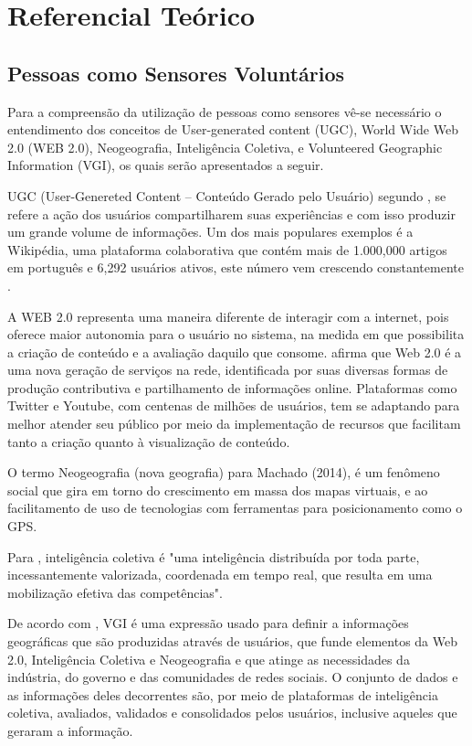 
\chapter{Referencial Teórico}

\section{Pessoas como Sensores Voluntários}
Para a compreensão da utilização de pessoas como sensores vê-se necessário o entendimento dos conceitos de User-generated content (UGC), World Wide Web 2.0 (WEB 2.0), Neogeografia, Inteligência Coletiva, e Volunteered Geographic Information (VGI), os quais serão apresentados a seguir. 

UGC (User-Genereted Content – Conteúdo Gerado pelo Usuário) segundo \cite{santos_avaliacao_2016}, se refere a ação dos usuários compartilharem suas experiências e com isso produzir um grande volume de informações. Um dos mais populares exemplos é a Wikipédia, uma plataforma colaborativa que contém mais de 1.000,000 artigos em português e 6,292 usuários ativos, este número vem crescendo constantemente \cite{Wikipedia2018}.

A WEB 2.0 representa uma maneira diferente de interagir com a internet, pois oferece maior autonomia para o usuário no sistema, na medida em que possibilita a criação de conteúdo e a avaliação daquilo que consome.  afirma que Web 2.0 é a uma nova geração de serviços na rede, identificada  por suas diversas formas de produção contributiva e partilhamento de informações online. Plataformas como Twitter e Youtube, com centenas de milhões de usuários, tem se adaptando para melhor atender seu público por meio da implementação de recursos que facilitam tanto a criação quanto à visualização de conteúdo. 

O termo Neogeografia (nova geografia) para  Machado (2014), é um fenômeno social que gira em torno do crescimento em massa dos mapas virtuais, e ao facilitamento de uso de tecnologias com ferramentas para posicionamento como o GPS.

Para , inteligência coletiva é "uma inteligência distribuída por toda parte, incessantemente valorizada, coordenada em tempo real, que resulta em uma mobilização efetiva das competências".

De acordo com , VGI é uma expressão usado para definir a informações geográficas que são produzidas através de usuários, que funde elementos da Web 2.0, Inteligência Coletiva e Neogeografia e que atinge as necessidades da indústria, do governo e das comunidades de redes sociais. O conjunto de dados e as informações deles decorrentes são, por meio de plataformas de inteligência coletiva, avaliados, validados e consolidados pelos usuários, inclusive aqueles que geraram a informação.

